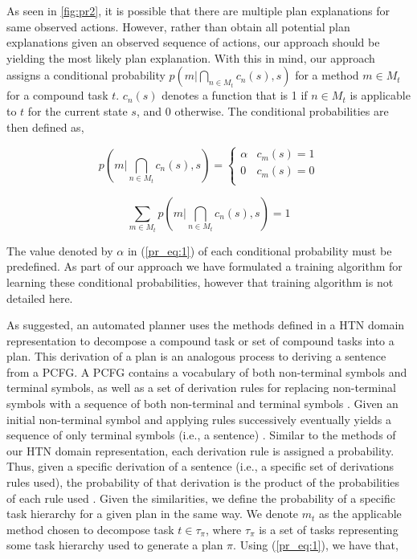 As seen in  \autoref{fig:pr2}, it is possible that there are multiple plan explanations for same observed actions. However, rather than obtain all potential plan explanations given an observed sequence of actions, our approach should be yielding the most likely plan explanation. With this in mind, our approach assigns a conditional probability $p(m | \bigcap_{n \in M_t} c_n(s), s)$ for a method $m \in M_t$ for a compound task $t$. $c_n(s)$ denotes a function that is 1 if $n \in M_t$ is applicable to $t$ for the current state $s$, and 0 otherwise. The conditional probabilities are then defined as,

\begin{equation} \label{pr_eq:1}
p(m | \bigcap_{n \in M_t} c_n(s), s) = \begin{cases} \alpha  & c_m(s) = 1 \\ 0 & c_m(s) = 0 \\ \end{cases}
\end{equation}

\begin{equation}  \label{pr_eq:2}
\sum_{m \in M_t} p(m | \bigcap_{n \in M_t} c_n(s), s) = 1
\end{equation}

The value denoted by $\alpha$ in (\ref{pr_eq:1}) of each conditional probability must be predefined. As part of our approach we have formulated a training algorithm for learning these conditional probabilities, however that training algorithm is not detailed here.

As suggested, an automated planner uses the methods defined in a HTN domain representation to decompose a compound task or set of compound tasks into a plan. This derivation of a plan is an analogous process to deriving a sentence from a PCFG. A PCFG contains a vocabulary of both non-terminal symbols and terminal symbols, as well as a set of derivation rules for replacing non-terminal symbols with a sequence of both non-terminal and terminal symbols \citep{Collins_2011}. Given an initial non-terminal symbol and applying rules successively eventually yields a sequence of only terminal symbols (i.e., a sentence) \citep{Collins_2011}. Similar to the methods of our HTN domain representation, each derivation rule is assigned a probability. Thus, given a specific derivation of a sentence (i.e., a specific set of derivations rules used), the probability of that derivation is the product of the probabilities of each rule used \citep{Collins_2011}. Given the similarities, we define the probability of a specific task hierarchy for a given plan in the same way. We denote $m_t$ as the applicable method chosen to decompose task $t \in \tau_\pi$, where $\tau_\pi$ is a set of tasks representing some task hierarchy used to generate a plan $\pi$. Using (\ref{pr_eq:1}), we have that,

